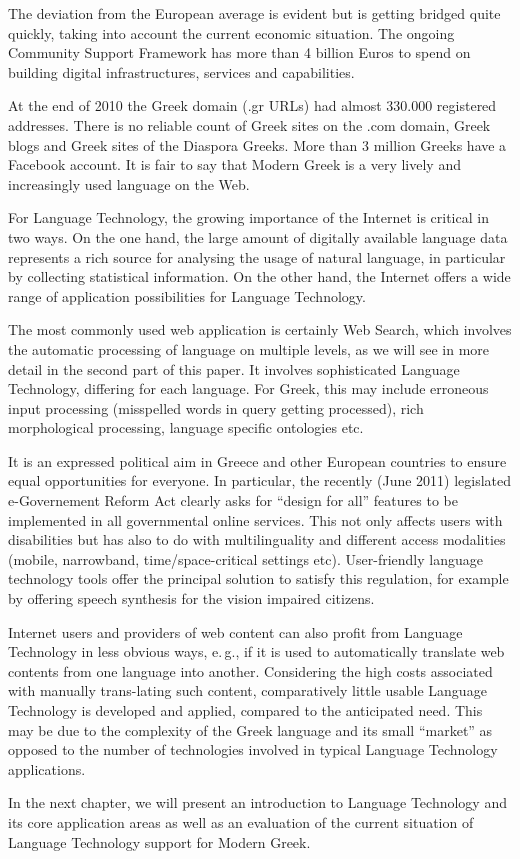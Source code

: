 \documentclass[]{../../metanetpaper}
\begin{document}
\begin{multicols}{2}
The deviation from the European average is evident but is getting bridged quite quickly, taking into account the current economic situation. The ongoing Community Support Framework has more than 4 billion Euros to spend on building digital infrastructures, services and capabilities.

At the end of 2010 the Greek domain (.gr URLs) had almost 330.000 registered addresses. There is no reliable count of Greek sites on the .com domain, Greek blogs and Greek sites of the Diaspora Greeks. More than 3 million Greeks have a Facebook account. It is fair to say that Modern Greek is a very lively and increasingly used language on the Web.

For Language Technology, the growing importance of the Internet is critical in two ways. On the one hand, the large amount of digitally available language data represents a rich source for analysing the usage of natural language, in particular by collecting statistical information. On the other hand, the Internet offers a wide range of application possibilities for Language Technology.

The most commonly used web application is certainly Web Search, which involves the automatic processing of language on multiple levels, as we will see in more detail in the second part of this paper. It involves sophisticated Language Technology, differing for each language. For Greek, this may include erroneous input processing (misspelled words in query getting processed), rich morphological processing, language specific ontologies etc.

It is an expressed political aim in Greece and other European countries to ensure equal opportunities for everyone. In particular, the recently (June 2011) legislated e-Governement Reform Act clearly asks for “design for all” features to be implemented in all governmental online services. This not only affects users with disabilities but has also to do with multilinguality and different access modalities (mobile, narrowband, time/space-critical settings etc). User-friendly language technology tools offer the principal solution to satisfy this regulation, for example by offering speech synthesis for the vision impaired citizens.

Internet users and providers of web content can also profit from Language Technology in less obvious ways, e.\,g., if it is used to automatically translate web contents from one language into another. Considering the high costs associated with manually trans-lating such content, comparatively little usable Language Technology is developed and applied, compared to the anticipated need. This may be due to the complexity of the Greek language and its small “market” as opposed to the number of technologies involved in typical Language Technology applications. 

In the next chapter, we will present an introduction to Language Technology and its core application areas as well as an evaluation of the current situation of Language Technology support for Modern Greek.
\end{multicols}
\end{document}
